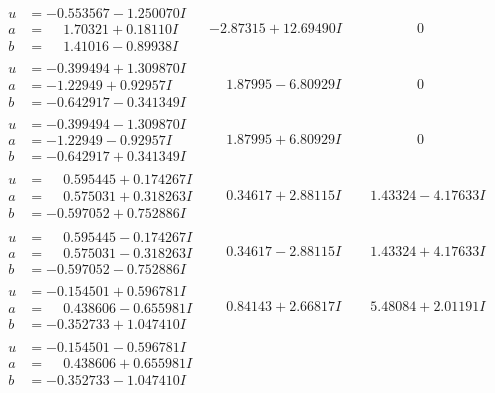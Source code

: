 \documentclass[1p]{elsarticle_modified}
\theoremstyle{definition}
\begin{document}
$$\begin{array}{c|c|c}
\begin{aligned}
u &= -0.553567 - 1.250070 I \\
a &= \phantom{-}1.70321 + 0.18110 I \\
b &= \phantom{-}1.41016 - 0.89938 I\end{aligned}
 & -2.87315 + 12.69490 I & \phantom{-0.000000 } 0 \\ \hline\begin{aligned}
u &= -0.399494 + 1.309870 I \\
a &= -1.22949 + 0.92957 I \\
b &= -0.642917 - 0.341349 I\end{aligned}
 & \phantom{-}1.87995 - 6.80929 I & \phantom{-0.000000 } 0 \\ \hline\begin{aligned}
u &= -0.399494 - 1.309870 I \\
a &= -1.22949 - 0.92957 I \\
b &= -0.642917 + 0.341349 I\end{aligned}
 & \phantom{-}1.87995 + 6.80929 I & \phantom{-0.000000 } 0 \\ \hline\begin{aligned}
u &= \phantom{-}0.595445 + 0.174267 I \\
a &= \phantom{-}0.575031 + 0.318263 I \\
b &= -0.597052 + 0.752886 I\end{aligned}
 & \phantom{-}0.34617 + 2.88115 I & \phantom{-}1.43324 - 4.17633 I \\ \hline\begin{aligned}
u &= \phantom{-}0.595445 - 0.174267 I \\
a &= \phantom{-}0.575031 - 0.318263 I \\
b &= -0.597052 - 0.752886 I\end{aligned}
 & \phantom{-}0.34617 - 2.88115 I & \phantom{-}1.43324 + 4.17633 I \\ \hline\begin{aligned}
u &= -0.154501 + 0.596781 I \\
a &= \phantom{-}0.438606 - 0.655981 I \\
b &= -0.352733 + 1.047410 I\end{aligned}
 & \phantom{-}0.84143 + 2.66817 I & \phantom{-}5.48084 + 2.01191 I \\ \hline\begin{aligned}
u &= -0.154501 - 0.596781 I \\
a &= \phantom{-}0.438606 + 0.655981 I \\
b &= -0.352733 - 1.047410 I\end{aligned}

\end{array}$$
\end{document}
